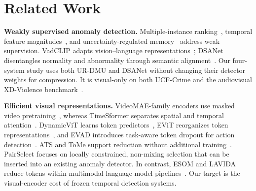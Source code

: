 \section{Related Work}
\label{sec:related}
\textbf{Weakly supervised anomaly detection.}
Multiple-instance ranking~\cite{sultani2018real}, temporal feature magnitudes~\cite{tian2021rtfm}, and uncertainty-regulated memory~\cite{zhou2023urdmu} address weak supervision. VadCLIP adapts vision--language representations~\cite{wu2024vadclip}; DSANet disentangles normality and abnormality through semantic alignment~\cite{yin2026learning}. Our four-system study uses both UR-DMU and DSANet without changing their detector weights for compression. It is visual-only on both UCF-Crime and the audiovisual XD-Violence benchmark~\cite{wu2020xd}.

\textbf{Efficient visual representations.}
VideoMAE-family encoders use masked video pretraining~\cite{tong2022videomae,wang2023videomaev2}, whereas TimeSformer separates spatial and temporal attention~\cite{bertasius2021timesformer}. DynamicViT learns token predictors~\cite{rao2021dynamicvit}, EViT reorganizes token representations~\cite{liang2022evit}, and EVAD introduces task-aware token dropout for action detection~\cite{chen2023evad}. ATS and ToMe support reduction without additional training~\cite{fayyaz2022ats,bolya2023tome}. PairSelect focuses on locally constrained, non-mixing selection that can be inserted into an existing anomaly detector. In contrast, ESOM and LAVIDA reduce tokens within multimodal language-model pipelines~\cite{liu2026esom,dai2026lavida}. Our target is the visual-encoder cost of frozen temporal detection systems.
